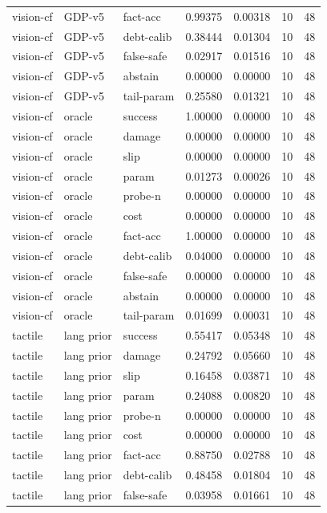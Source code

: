 \documentclass{article}
\begin{document}
\begin{center}
\begin{longtable}{lllllll}
vision-cf & GDP-v5 & fact-acc & 0.99375 & 0.00318 & 10 & 48 \\
vision-cf & GDP-v5 & debt-calib & 0.38444 & 0.01304 & 10 & 48 \\
vision-cf & GDP-v5 & false-safe & 0.02917 & 0.01516 & 10 & 48 \\
vision-cf & GDP-v5 & abstain & 0.00000 & 0.00000 & 10 & 48 \\
vision-cf & GDP-v5 & tail-param & 0.25580 & 0.01321 & 10 & 48 \\
vision-cf & oracle & success & 1.00000 & 0.00000 & 10 & 48 \\
vision-cf & oracle & damage & 0.00000 & 0.00000 & 10 & 48 \\
vision-cf & oracle & slip & 0.00000 & 0.00000 & 10 & 48 \\
vision-cf & oracle & param & 0.01273 & 0.00026 & 10 & 48 \\
vision-cf & oracle & probe-n & 0.00000 & 0.00000 & 10 & 48 \\
vision-cf & oracle & cost & 0.00000 & 0.00000 & 10 & 48 \\
vision-cf & oracle & fact-acc & 1.00000 & 0.00000 & 10 & 48 \\
vision-cf & oracle & debt-calib & 0.04000 & 0.00000 & 10 & 48 \\
vision-cf & oracle & false-safe & 0.00000 & 0.00000 & 10 & 48 \\
vision-cf & oracle & abstain & 0.00000 & 0.00000 & 10 & 48 \\
vision-cf & oracle & tail-param & 0.01699 & 0.00031 & 10 & 48 \\
tactile & lang prior & success & 0.55417 & 0.05348 & 10 & 48 \\
tactile & lang prior & damage & 0.24792 & 0.05660 & 10 & 48 \\
tactile & lang prior & slip & 0.16458 & 0.03871 & 10 & 48 \\
tactile & lang prior & param & 0.24088 & 0.00820 & 10 & 48 \\
tactile & lang prior & probe-n & 0.00000 & 0.00000 & 10 & 48 \\
tactile & lang prior & cost & 0.00000 & 0.00000 & 10 & 48 \\
tactile & lang prior & fact-acc & 0.88750 & 0.02788 & 10 & 48 \\
tactile & lang prior & debt-calib & 0.48458 & 0.01804 & 10 & 48 \\
tactile & lang prior & false-safe & 0.03958 & 0.01661 & 10 & 48 \\
\bottomrule
\end{longtable}
\renewcommand{\arraystretch}{1.0}
\end{center}
\end{document}
